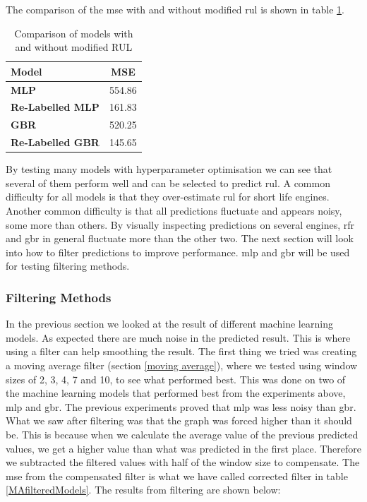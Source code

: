 \documentclass[english, a4paper]{report}
\begin{document}
{{{{                The comparison of the \gls{mse} with and without modified \gls{rul} is shown in table \ref{mseComparisonBeforeFilter}. 
                
                \begin{table}[H]
                    \centering
                    \begin{tabular}{|l|c|}
                        \hline
                        \textbf{Model}          & \textbf{MSE} \\ \hline
                        \textbf{MLP}            & 554.86       \\ \hline
                        \textbf{Re-Labelled MLP} & 161.83       \\ \hline
                        \textbf{GBR}            & 520.25       \\ \hline
                        \textbf{Re-Labelled GBR} & 145.65       \\ \hline
                    \end{tabular}
                    \caption{Comparison of models with and without modified RUL}
                    \label{mseComparisonBeforeFilter}
                \end{table}
                
                By testing many models with hyperparameter optimisation we can see that several of them perform well and can be selected to predict \gls{rul}. A common difficulty for all models is that they over-estimate \gls{rul} for short life engines. Another common difficulty is that all predictions fluctuate and appears noisy, some more than others. By visually inspecting predictions on several engines, \gls{rfr} and \gls{gbr} in general fluctuate more than the other two. The next section will look into how to filter predictions to improve performance. \gls{mlp} and \gls{gbr} will be used for testing filtering methods.
            }
            
            \subsubsection{Filtering Methods}
            {
                In the previous section we looked at the result of different machine learning models. As expected there are much noise in the predicted result. This is where using a filter can help smoothing the result. The first thing we tried was creating a moving average filter (section \ref{moving average}), where we tested using window sizes of 2, 3, 4, 7 and 10, to see what performed best. This was done on two of the machine learning models that performed best from the experiments above, \gls{mlp} and \gls{gbr}. The previous experiments proved that \gls{mlp} was less noisy than \gls{gbr}. What we saw after filtering was that the graph was forced higher than it should be. This is because when we calculate the average value of the previous predicted values, we get a higher value than what was predicted in the first place. Therefore we subtracted the filtered values with half of the window size to compensate. The \gls{mse} from the compensated filter is what we have called corrected filter in table \ref{MAfilteredModels}. The results from filtering are shown below:
                
}}}}
\end{document}
